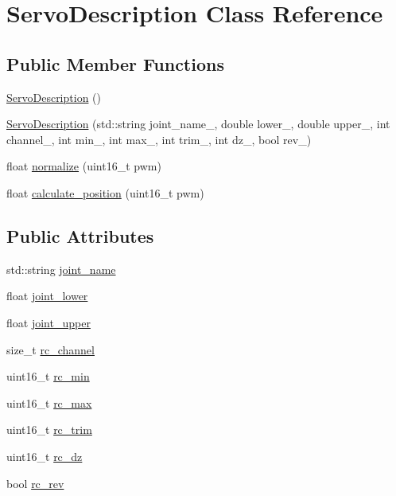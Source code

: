 \hypertarget{classServoDescription}{}\section{Servo\+Description Class Reference}
\label{classServoDescription}
\subsection*{Public Member Functions}
\begin{DoxyCompactItemize}
\item 
\mbox{\hyperlink{classServoDescription_ade48340af8bb04123e9f7e74749ad75e}{Servo\+Description}} ()
\item 
\mbox{\hyperlink{classServoDescription_aeb5d29abe6875a60140c5e27e5e3f419}{Servo\+Description}} (std\+::string joint\+\_\+name\+\_\+, double lower\+\_\+, double upper\+\_\+, int channel\+\_\+, int min\+\_\+, int max\+\_\+, int trim\+\_\+, int dz\+\_\+, bool rev\+\_\+)
\item 
float \mbox{\hyperlink{classServoDescription_a9b53028329d9f4730d0e954ba682bc6b}{normalize}} (uint16\+\_\+t pwm)
\item 
float \mbox{\hyperlink{classServoDescription_aac283ff9565c80e5dd5434a03b2d5ab0}{calculate\+\_\+position}} (uint16\+\_\+t pwm)
\end{DoxyCompactItemize}
\subsection*{Public Attributes}
\begin{DoxyCompactItemize}
\item 
std\+::string \mbox{\hyperlink{classServoDescription_ad341e00d12a3f4f2688461895cc4d617}{joint\+\_\+name}}
\item 
float \mbox{\hyperlink{classServoDescription_a260add37256676b422f92cd7331ede8c}{joint\+\_\+lower}}
\item 
float \mbox{\hyperlink{classServoDescription_a3471d565e6be0538f61ccf9c666e9bdf}{joint\+\_\+upper}}
\item 
size\+\_\+t \mbox{\hyperlink{classServoDescription_ae77953ec190417bc8bcbffd30c69c525}{rc\+\_\+channel}}
\item 
uint16\+\_\+t \mbox{\hyperlink{classServoDescription_add84ff84b13562dcc72fb2a7d7f05990}{rc\+\_\+min}}
\item 
uint16\+\_\+t \mbox{\hyperlink{classServoDescription_aff03b39826e42b6a5a1564fb15ee2b50}{rc\+\_\+max}}
\item 
uint16\+\_\+t \mbox{\hyperlink{classServoDescription_a53f8532ce38683c545375dbc5e58d2e2}{rc\+\_\+trim}}
\item 
uint16\+\_\+t \mbox{\hyperlink{classServoDescription_a769eb578d438192da7b6012c52686ba7}{rc\+\_\+dz}}
\item 
bool \mbox{\hyperlink{classServoDescription_ace31258fe387d6edb10b35e31adffd93}{rc\+\_\+rev}}
\end{DoxyCompactItemize}


